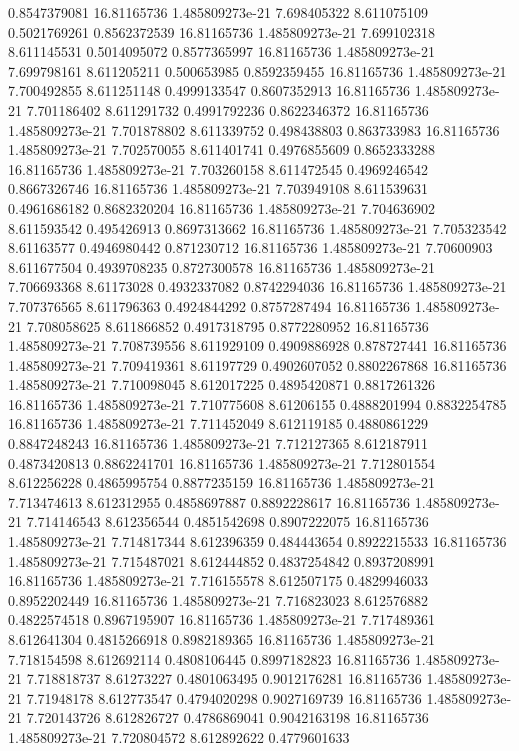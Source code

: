 {0.8547379081 16.81165736 1.485809273e-21 7.698405322 8.611075109 0.5021769261
0.8562372539 16.81165736 1.485809273e-21 7.699102318 8.611145531 0.5014095072
0.8577365997 16.81165736 1.485809273e-21 7.699798161 8.611205211 0.500653985
0.8592359455 16.81165736 1.485809273e-21 7.700492855 8.611251148 0.4999133547
0.8607352913 16.81165736 1.485809273e-21 7.701186402 8.611291732 0.4991792236
0.8622346372 16.81165736 1.485809273e-21 7.701878802 8.611339752 0.498438803
0.863733983 16.81165736 1.485809273e-21 7.702570055 8.611401741 0.4976855609
0.8652333288 16.81165736 1.485809273e-21 7.703260158 8.611472545 0.4969246542
0.8667326746 16.81165736 1.485809273e-21 7.703949108 8.611539631 0.4961686182
0.8682320204 16.81165736 1.485809273e-21 7.704636902 8.611593542 0.495426913
0.8697313662 16.81165736 1.485809273e-21 7.705323542 8.61163577 0.4946980442
0.871230712 16.81165736 1.485809273e-21 7.70600903 8.611677504 0.4939708235
0.8727300578 16.81165736 1.485809273e-21 7.706693368 8.61173028 0.4932337082
0.8742294036 16.81165736 1.485809273e-21 7.707376565 8.611796363 0.4924844292
0.8757287494 16.81165736 1.485809273e-21 7.708058625 8.611866852 0.4917318795
0.8772280952 16.81165736 1.485809273e-21 7.708739556 8.611929109 0.4909886928
0.878727441 16.81165736 1.485809273e-21 7.709419361 8.61197729 0.4902607052
0.8802267868 16.81165736 1.485809273e-21 7.710098045 8.612017225 0.4895420871
0.8817261326 16.81165736 1.485809273e-21 7.710775608 8.61206155 0.4888201994
0.8832254785 16.81165736 1.485809273e-21 7.711452049 8.612119185 0.4880861229
0.8847248243 16.81165736 1.485809273e-21 7.712127365 8.612187911 0.4873420813
0.8862241701 16.81165736 1.485809273e-21 7.712801554 8.612256228 0.4865995754
0.8877235159 16.81165736 1.485809273e-21 7.713474613 8.612312955 0.4858697887
0.8892228617 16.81165736 1.485809273e-21 7.714146543 8.612356544 0.4851542698
0.8907222075 16.81165736 1.485809273e-21 7.714817344 8.612396359 0.484443654
0.8922215533 16.81165736 1.485809273e-21 7.715487021 8.612444852 0.4837254842
0.8937208991 16.81165736 1.485809273e-21 7.716155578 8.612507175 0.4829946033
0.8952202449 16.81165736 1.485809273e-21 7.716823023 8.612576882 0.4822574518
0.8967195907 16.81165736 1.485809273e-21 7.717489361 8.612641304 0.4815266918
0.8982189365 16.81165736 1.485809273e-21 7.718154598 8.612692114 0.4808106445
0.8997182823 16.81165736 1.485809273e-21 7.718818737 8.61273227 0.4801063495
0.9012176281 16.81165736 1.485809273e-21 7.71948178 8.612773547 0.4794020298
0.9027169739 16.81165736 1.485809273e-21 7.720143726 8.612826727 0.4786869041
0.9042163198 16.81165736 1.485809273e-21 7.720804572 8.612892622 0.4779601633
}
